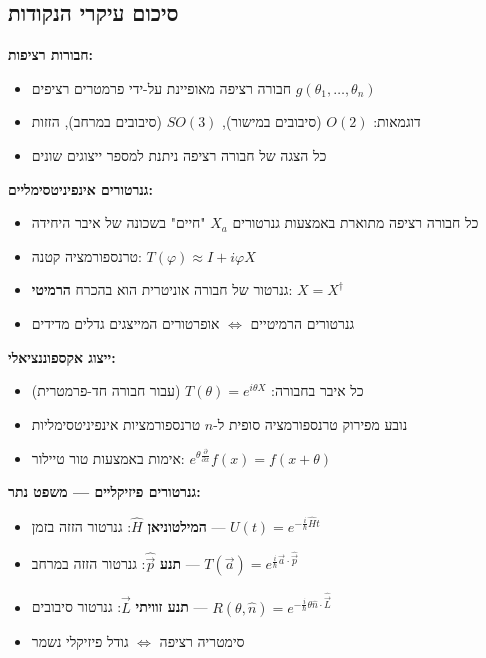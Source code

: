 \subsection{סיכום עיקרי הנקודות}

\begin{summarybox}
\textbf{חבורות רציפות:}
\begin{itemize}
    \item חבורה רציפה מאופיינת על-ידי פרמטרים רציפים $g(\theta_1, \ldots, \theta_n)$
    \item דוגמאות: $O(2)$ (סיבובים במישור), $SO(3)$ (סיבובים במרחב), הזזות
    \item כל הצגה של חבורה רציפה ניתנת למספר ייצוגים שונים
\end{itemize}

\textbf{גנרטורים אינפיניטסימליים:}
\begin{itemize}
    \item כל חבורה רציפה מתוארת באמצעות גנרטורים $X_a$ "חיים" בשכונה של איבר היחידה
    \item טרנספורמציה קטנה: $T(\varphi) \approx I + i\varphi X$
    \item גנרטור של חבורה אוניטרית הוא בהכרח \textbf{הרמיטי}: $X = X^\dagger$
    \item גנרטורים הרמיטיים $\Leftrightarrow$ אופרטורים המייצגים גדלים מדידים
\end{itemize}

\textbf{ייצוג אקספוננציאלי:}
\begin{itemize}
    \item כל איבר בחבורה: $T(\theta) = e^{i\theta X}$ (עבור חבורה חד-פרמטרית)
    \item נובע מפירוק טרנספורמציה סופית ל-$n$ טרנספורמציות אינפיניטסימליות
    \item אימות באמצעות טור טיילור: $e^{\theta\frac{\partial}{\partial x}}f(x) = f(x + \theta)$
\end{itemize}

\textbf{גנרטורים פיזיקליים — משפט נתר:}
\begin{itemize}
    \item \textbf{המילטוניאן} $\hat{H}$: גנרטור הזזה בזמן — $U(t) = e^{-\frac{i}{\hbar}\hat{H}t}$
    \item \textbf{תנע} $\hat{\vec{p}}$: גנרטור הזזה במרחב — $T(\vec{a}) = e^{\frac{i}{\hbar}\vec{a} \cdot \hat{\vec{p}}}$
    \item \textbf{תנע זוויתי} $\hat{\vec{L}}$: גנרטור סיבובים — $R(\theta, \hat{n}) = e^{-\frac{i}{\hbar}\theta \hat{n} \cdot \hat{\vec{L}}}$
    \item סימטריה רציפה $\Leftrightarrow$ גודל פיזיקלי נשמר
\end{itemize}


\end{summarybox}

